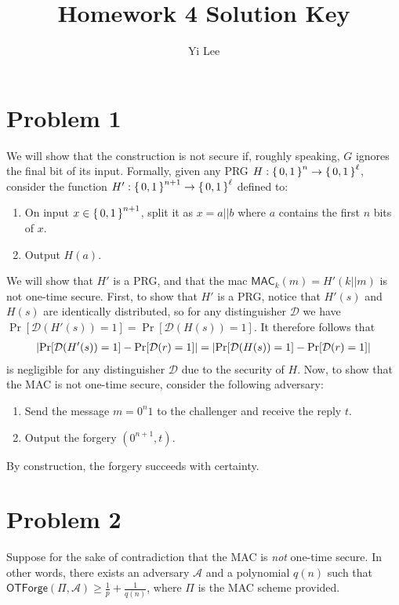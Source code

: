 \documentclass{article}
\title{Homework 4 Solution Key}
\author{Yi Lee}
\theoremstyle{definition}
\begin{document}


\maketitle

\section*{Problem 1}

We will show that the construction is not secure if, roughly speaking, $G$ ignores the final bit of its input.
Formally, given any PRG $H:\set{0, 1}^n\rightarrow\set{0, 1}^\ell$,
consider the function $H':\set{0, 1}^{n+1}\rightarrow\set{0, 1}^\ell$ defined to: \begin{enumerate}
    \item On input $x\in\set{0, 1}^{n+1}$, split it as $x=a || b$ where $a$ contains the first $n$ bits of $x$.
    \item Output $H(a)$.
\end{enumerate}
We will show that $H'$ is a PRG, and that the mac $\mathsf{MAC}_k(m)=H'(k || m)$ is not one-time secure.
First, to show that $H'$ is a PRG, notice that $H'(s)$ and $H(s)$ are identically distributed, so for any distinguisher $\mathcal{D}$ we have
$\Pr[\mathcal{D}(H'(s))=1]=\Pr[\mathcal{D}(H(s))=1]$.
It therefore follows that
\begin{align*}
    \abs{\Pr[\mathcal{D}(H'(s))=1] - \Pr[\mathcal{D}(r)=1]} =
    \abs{\Pr[\mathcal{D}(H(s))=1] - \Pr[\mathcal{D}(r)=1]}
\end{align*}
is negligible for any distinguisher $\mathcal{D}$ due to the security of $H$.
Now, to show that the MAC is not one-time secure, consider the following adversary:
\begin{enumerate}
    \item Send the message $m=0^n1$ to the challenger and receive the reply $t$.
    \item Output the forgery $(0^{n+1}, t)$.
\end{enumerate}
By construction, the forgery succeeds with certainty.

\section*{Problem 2}

Suppose for the sake of contradiction that the MAC is \emph{not} one-time secure.
In other words, there exists an adversary $\mathcal{A}$ and a polynomial $q(n)$ such that
$\mathsf{OTForge}(\Pi, \mathcal{A})\geq\frac{1}{p} + \frac{1}{q(n)}$,
where $\Pi$ is the MAC scheme provided.
\end{document}
